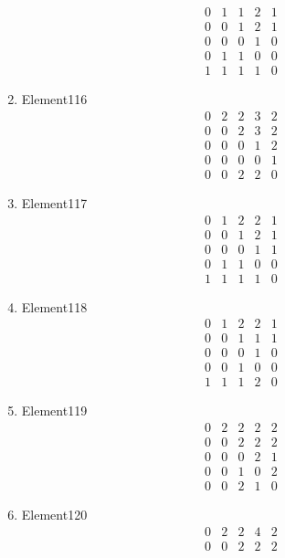 \documentclass[12pt]{article}
\begin{document}
\begin{multicols}{3}
\begin{enumerate}
\begin{equation*}
\begin{array}{ccccc}
0&1&1&2&1\\
0&0&1&2&1\\
0&0&0&1&0\\
0&1&1&0&0\\
1&1&1&1&0
\end{array}
\end{equation*}
\item Element116
\begin{equation*}
\begin{array}{ccccc}
0&2&2&3&2\\
0&0&2&3&2\\
0&0&0&1&2\\
0&0&0&0&1\\
0&0&2&2&0
\end{array}
\end{equation*}
\item Element117
\begin{equation*}
\begin{array}{ccccc}
0&1&2&2&1\\
0&0&1&2&1\\
0&0&0&1&1\\
0&1&1&0&0\\
1&1&1&1&0
\end{array}
\end{equation*}
\item Element118
\begin{equation*}
\begin{array}{ccccc}
0&1&2&2&1\\
0&0&1&1&1\\
0&0&0&1&0\\
0&0&1&0&0\\
1&1&1&2&0
\end{array}
\end{equation*}
\item Element119
\begin{equation*}
\begin{array}{ccccc}
0&2&2&2&2\\
0&0&2&2&2\\
0&0&0&2&1\\
0&0&1&0&2\\
0&0&2&1&0
\end{array}
\end{equation*}
\item Element120
\begin{equation*}
\begin{array}{ccccc}
0&2&2&4&2\\
0&0&2&2&2\\

\end{array}
\end{equation*}
\end{enumerate}
\end{multicols}
\end{document}
